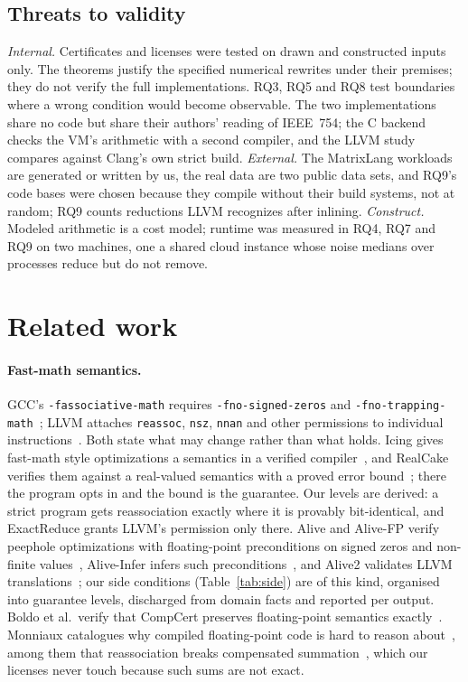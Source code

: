 \documentclass[acmsmall,review,anonymous,nonacm]{acmart}
\begin{document}
\subsection{Threats to validity}
\emph{Internal.} Certificates and licenses were tested on drawn and constructed
inputs only. The theorems justify the specified numerical rewrites under their
premises; they do not verify the full implementations. RQ3, RQ5 and RQ8 test
boundaries where a wrong condition would become observable.
The two implementations share no code but share their authors'
reading of IEEE~754; the C backend checks the VM's arithmetic with a second
compiler, and the LLVM study compares against Clang's own strict build.
\emph{External.} The MatrixLang workloads are generated or written by us, the
real data are two public data sets, and RQ9's code bases were chosen because
they compile without their build systems, not at random; RQ9 counts reductions
LLVM recognizes after inlining. \emph{Construct.} Modeled arithmetic is a cost
model; runtime was measured in RQ4, RQ7 and RQ9 on two machines, one a shared
cloud instance whose noise medians over processes reduce but do not remove.

\section{Related work}
\paragraph{Fast-math semantics.} GCC's \texttt{-fassociative-math} requires
\texttt{-fno-signed-zeros} and \texttt{-fno-trapping-math}~\cite{gcc-opts};
LLVM attaches \texttt{reassoc}, \texttt{nsz}, \texttt{nnan} and other permissions
to individual instructions~\cite{llvm-fmf}. Both state what may change rather
than what holds. Icing gives fast-math style optimizations a semantics in a
verified compiler~\cite{icing}, and RealCake verifies them against a
real-valued semantics with a proved error bound~\cite{realcake}; there the
program opts in and the bound is the guarantee. Our levels are derived: a
strict program gets reassociation exactly where it is provably bit-identical,
and ExactReduce grants LLVM's permission only there. Alive and Alive-FP verify
peephole optimizations with floating-point preconditions on signed zeros and
non-finite values~\cite{alive,alive-fp}, Alive-Infer infers such
preconditions~\cite{alive-infer}, and Alive2 validates LLVM
translations~\cite{alive2}; our side conditions (Table~\ref{tab:side}) are of
this kind, organised into guarantee levels, discharged from domain facts and
reported per output. Boldo et al.\ verify that CompCert preserves floating-point
semantics exactly~\cite{compcert-fp}. Monniaux catalogues why compiled
floating-point code is hard to reason about~\cite{monniaux}, among them that
reassociation breaks compensated summation~\cite{kahan}, which our licenses
never touch because such sums are not exact.
\end{document}
